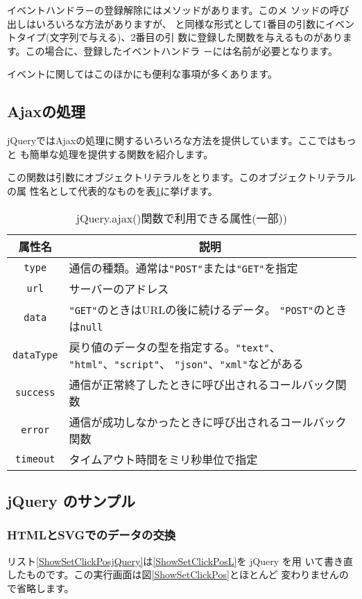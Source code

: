 イベントハンドラ－の登録解除にはメソッドがあります。このメ
ソッドの呼び出しはいろいろな方法がありますが、
と同様な形式として1番目の引数にイベントタイプ(文字列で与える)、2番目の引
数に登録した関数を与えるものがあります。この場合に、登録したイベントハンドラ
－には名前が必要となります。

イベントに関してはこのほかにも便利な事項が多くあります。
\subsection{Ajaxの処理}
jQueryではAjaxの処理に関するいろいろな方法を提供しています。ここではもっと
も簡単な処理を提供する関数を紹介します。

この関数は引数にオブジェクトリテラルをとります。このオブジェクトリテラルの属
性名として代表的なものを表\ref{jQueryAjax}に挙げます。
\begin{table}[ht]
 \caption{jQuery.ajax()関数で利用できる属性(一部))}\label{jQueryAjax}
\begin{center}
 \begin{tabular}{|c|m{}|}\hline
属性名  &\multicolumn{1}{c|}{説明} \\\hline
  \texttt{type}&通信の種類。通常は\texttt{"POST"}または\texttt{"GET"}を指定\\
  \hline
  \texttt{url}&サーバーのアドレス\\ \hline
  \texttt{data}&\texttt{"GET"}のときはURLの後に続けるデータ。
      \texttt{"POST"}のときは\texttt{null}\\ \hline
  \texttt{dataType}&戻り値のデータの型を指定する。\texttt{"text"}、
      \texttt{"html"}、\texttt{"script"}、      
\texttt{"json"}、\texttt{"xml"}などがある\\ \hline
\texttt{success}&通信が正常終了したときに呼び出されるコールバック関数
      \\ \hline
\texttt{error}&通信が成功しなかったときに呼び出されるコールバック関数
      \\ \hline
  \texttt{timeout}&タイムアウト時間をミリ秒単位で指定\\ \hline
 \end{tabular}
\end{center}
\end{table}
\subsection{jQuery のサンプル}
\renewcommand{\FuncRef}[1]{{機能\ref{#1}}}
\subsubsection{HTMLとSVGでのデータの交換}
リスト\ref{ShowSetClickPosjQuery}は\ref{ShowSetClickPosL}を jQuery を用
いて書き直したものです。この実行画面は図\ref{ShowSetClickPos}とほとんど
変わりませんので省略します。

